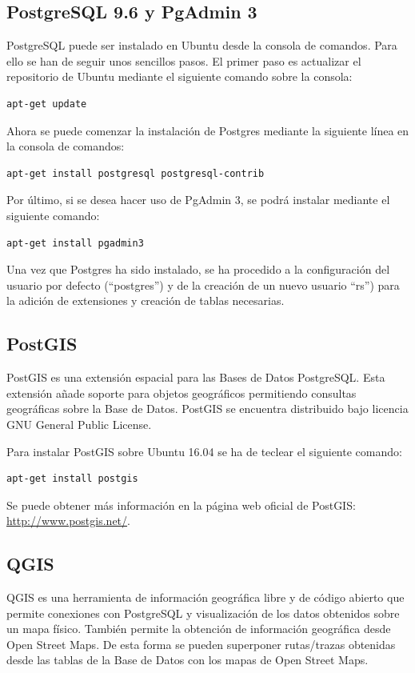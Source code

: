 \subsection{PostgreSQL 9.6 y PgAdmin 3}
PostgreSQL puede ser instalado en Ubuntu desde la consola de comandos. Para ello se han de seguir unos sencillos pasos.
El primer paso es actualizar el repositorio de Ubuntu mediante el siguiente comando sobre la consola:
\begin{lstlisting}
apt-get update
\end{lstlisting}
Ahora se puede comenzar la instalación de Postgres mediante la siguiente línea en la consola de comandos:
\begin{lstlisting}
apt-get install postgresql postgresql-contrib
\end{lstlisting}

Por último, si se desea hacer uso de PgAdmin 3, se podrá instalar mediante el siguiente comando:
\begin{lstlisting}
apt-get install pgadmin3
\end{lstlisting}

Una vez que Postgres ha sido instalado, se ha procedido a la configuración del usuario por defecto (``postgres'') y de la creación de un nuevo usuario ``rs'') para la adición de extensiones y creación de tablas necesarias.

\subsection{PostGIS}
PostGIS es una extensión espacial para las Bases de Datos PostgreSQL. Esta extensión añade soporte para objetos geográficos permitiendo consultas geográficas sobre la Base de Datos.
PostGIS se encuentra distribuido bajo licencia GNU General Public License.

Para instalar PostGIS sobre Ubuntu 16.04 se ha de teclear el siguiente comando:
\begin{lstlisting}
apt-get install postgis
\end{lstlisting}

Se puede obtener más información en la página web oficial de PostGIS: \url{http://www.postgis.net/}.

\subsection{QGIS}
QGIS es una herramienta de información geográfica libre y de código abierto que permite conexiones con PostgreSQL y visualización de los datos obtenidos sobre un mapa físico. También permite la obtención de información geográfica desde Open Street Maps. De esta forma se pueden superponer rutas/trazas obtenidas desde las tablas de la Base de Datos con los mapas de Open Street Maps.

